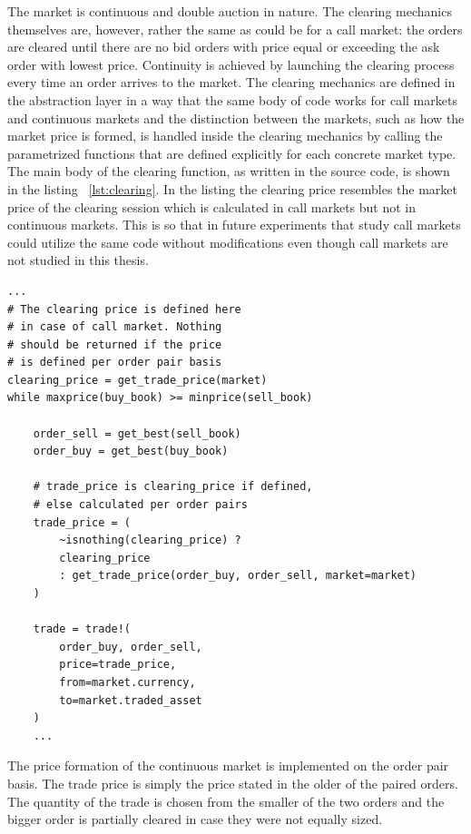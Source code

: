 The market is continuous and double auction in nature.
The clearing mechanics themselves are, however, 
rather the same as could be for a call market: 
the orders are cleared until there
are no bid orders with price equal or exceeding the
ask order with lowest price. 
Continuity is achieved by launching the clearing process
every time an order arrives to the market. 
The clearing mechanics are defined in 
the abstraction layer in a way that the same body
of code works for call markets and continuous markets
and the distinction between the markets, such as how 
the market price is formed, is handled inside the clearing
mechanics by calling the parametrized functions that are 
defined explicitly for each concrete market type. 
The main body of the clearing function, 
as written in the source code, is shown in the listing ~\ref{lst:clearing}.
In the listing the clearing price resembles the market price
of the clearing session which is calculated in call markets but not in
continuous markets. This is so that in future experiments
that study call markets could utilize the same code without modifications 
even though call markets are not studied in this thesis.


\begin{lstlisting}[caption={Clearing process},label={lst:clearing}]
...
# The clearing price is defined here
# in case of call market. Nothing
# should be returned if the price
# is defined per order pair basis
clearing_price = get_trade_price(market)
while maxprice(buy_book) >= minprice(sell_book)

    order_sell = get_best(sell_book)
    order_buy = get_best(buy_book)
    
    # trade_price is clearing_price if defined,
    # else calculated per order pairs
    trade_price = (
        ~isnothing(clearing_price) ? 
        clearing_price
        : get_trade_price(order_buy, order_sell, market=market)
    )

    trade = trade!(
        order_buy, order_sell, 
        price=trade_price, 
        from=market.currency, 
        to=market.traded_asset
    )
    ...
\end{lstlisting}

The price formation of the continuous market is implemented
on the order pair basis. The trade price is simply the price
stated in the older of the paired orders. %
The quantity of the trade is chosen from the smaller of the two orders
and the bigger order is partially cleared in case they were not 
equally sized.

